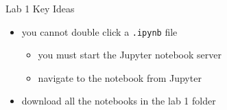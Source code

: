 \begin{frame}[fragile]{Lab 1 Key Ideas}
\protect\hypertarget{lab-1-key-ideas}{}
\begin{itemize}
\tightlist
\item
  you cannot double click a \texttt{.ipynb} file

  \begin{itemize}
  \tightlist
  \item
    you must start the Jupyter notebook server
  \item
    navigate to the notebook from Jupyter
  \end{itemize}
\item
  download all the notebooks in the lab 1 folder
\end{itemize}
\end{frame}
